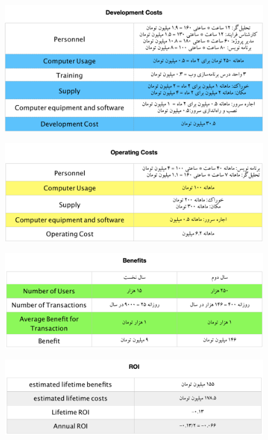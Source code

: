 \documentclass{article}
\begin{document}
\begin{center}

\begin{figure}[htp]
\includegraphics[width = 1\textwidth]{Dev2.png}
\caption{}
\label{dev2}
\end{figure}

\begin{figure}[htp]
\includegraphics[width = 1\textwidth]{Op2.png}
\caption{}
\label{op2}
\end{figure}

\begin{figure}[htp]
\includegraphics[width = 1\textwidth]{Ben2.png}
\caption{}
\label{ben2}
\end{figure}

\begin{figure}[htp]
\includegraphics[width = 1\textwidth]{ROI2.png}
\caption{}
\label{roi2}
\end{figure}


\end{center}
\end{document}

